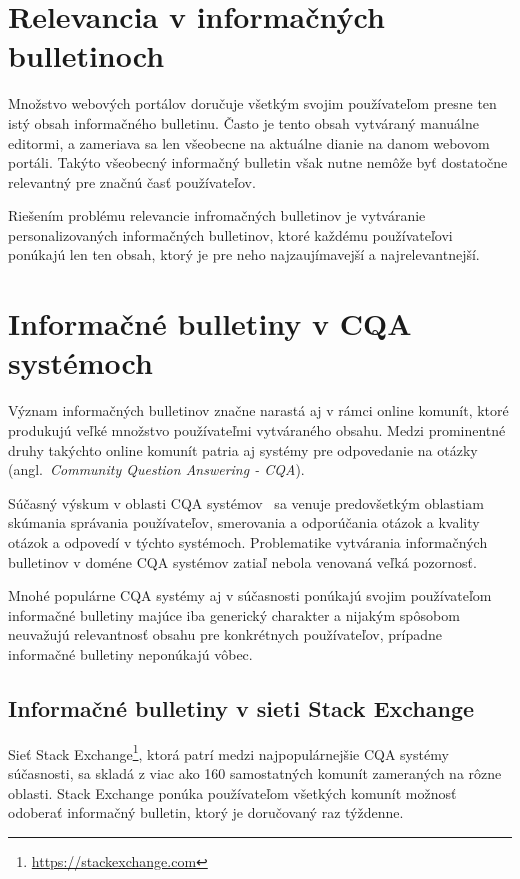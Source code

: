 \section{Relevancia v informačných bulletinoch}

Množstvo webových portálov doručuje všetkým svojim používateľom presne ten istý obsah informačného bulletinu.
Často je tento obsah vytváraný manuálne editormi, a zameriava sa len všeobecne na aktuálne dianie na danom webovom
portáli. Takýto všeobecný informačný bulletin však nutne nemôže byť dostatočne relevantný pre značnú časť používateľov.

Riešením problému relevancie infromačných bulletinov je vytváranie personalizovaných informačných bulletinov, ktoré
každému používateľovi ponúkajú len ten obsah, ktorý je pre neho najzaujímavejší a najrelevantnejší.


\section{Informačné bulletiny v CQA systémoch}

Význam informačných bulletinov značne narastá aj v rámci online komunít, ktoré produkujú veľké množstvo používateľmi
vytváraného obsahu. Medzi prominentné druhy takýchto online komunít patria aj systémy pre odpovedanie na otázky
(angl.~\emph{Community Question Answering - CQA}).

Súčasný výskum v oblasti CQA systémov~\cite{Srba2016} sa venuje predovšetkým oblastiam skúmania správania používateľov,
smerovania a odporúčania otázok a kvality otázok a odpovedí v týchto systémoch. Problematike vytvárania informačných
bulletinov v doméne CQA systémov zatiaľ nebola venovaná veľká pozornosť.

Mnohé populárne CQA systémy aj v súčasnosti ponúkajú svojim používateľom informačné bulletiny majúce iba generický
charakter a nijakým spôsobom neuvažujú relevantnosť obsahu pre konkrétnych používateľov, prípadne informačné bulletiny
neponúkajú vôbec.

\subsection{Informačné bulletiny v sieti Stack Exchange}

Sieť Stack Exchange\footnote{ \url{https://stackexchange.com}}, ktorá patrí medzi najpopulárnejšie CQA systémy súčasnosti,
sa skladá z viac ako 160 samostatných komunít zameraných na rôzne oblasti. Stack Exchange ponúka používateľom všetkých
komunít možnosť odoberať informačný bulletin, ktorý je doručovaný raz týždenne.

